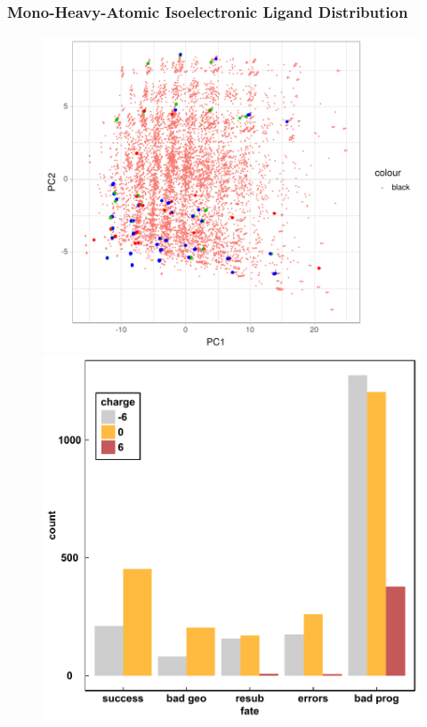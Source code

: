 \documentclass[xcolor=dvipsnames]{beamer}
\begin{document}
%

\begin{frame}
\frametitle{Mono-Heavy-Atomic Isoelectronic Ligand Distribution}
\begin{figure}[ht] 
	\label{ fig7} 
	\begin{minipage}[b]{0.5\linewidth}
		\centering
		\includegraphics[width=.6\linewidth]{img/pcaWithCalcs.pdf} 
	\end{minipage}%
	\begin{minipage}[b]{0.5\linewidth}
		\centering
		\includegraphics[width=.6\linewidth]{img/fateByCharge.pdf} 
	\end{minipage} 
	\begin{minipage}[b]{0.5\linewidth}
		\centering

\end{minipage}
\end{figure}
\end{frame}
\end{document}
